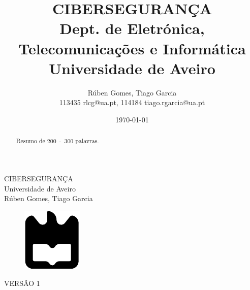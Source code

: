\documentclass{report}
\begin{document}
%
\def\titulo{CIBERSEGURANÇA}
\def\data{DATA}
\def\autores{Rúben Gomes, Tiago Garcia}
\def\autoresacronimos{RG, TG}
\def\autorescontactos{113435 rlcg@ua.pt, 114184 tiago.rgarcia@ua.pt}
\def\versao{VERSÃO 1}
\def\departamento{Dept. de Eletrónica, Telecomunicações e Informática}
\def\empresa{Universidade de Aveiro}
\def\logotipo{ua.pdf}

%
%
\begin{titlepage}

\begin{center}
%
\vspace*{50mm}
%
{\Huge \titulo}\\ 
%
\vspace{10mm}
%
{\Large \empresa}\\
%
\vspace{10mm}
%
{\LARGE \autores}\\ 
%
\vspace{30mm}
%
\begin{figure}[h]
    \center
    \includegraphics{ua}
\end{figure}
%
\vspace{30mm}
\end{center}
%
\begin{flushright}
\versao
\end{flushright}
\end{titlepage}

\title{%
{\Huge\textbf{\titulo}}\\
{\Large \departamento\\ \empresa}
}
%
\author{%
    \autores \\
    \autorescontactos
}
%
\date{\today}
%
\maketitle


\begin{abstract}
Resumo de 200~-~300 palavras.
\end{abstract}

\end{document}
